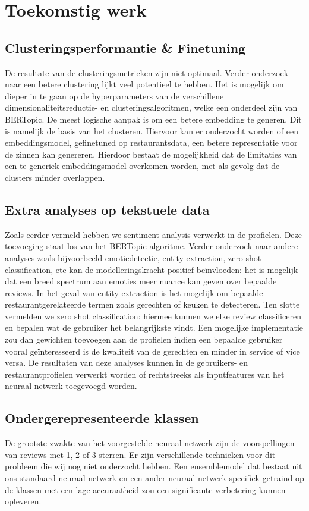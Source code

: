 \section{Toekomstig werk}
\subsection*{Clusteringsperformantie \& Finetuning}
De resultate van de clusteringsmetrieken zijn niet optimaal. Verder onderzoek naar een betere clustering lijkt veel potentieel te hebben. Het is mogelijk om dieper in te gaan op de hyperparameters van de verschillene dimensionaliteitsreductie- en clusteringsalgoritmen, welke een onderdeel zijn van BERTopic. De meest logische aanpak is om een betere embedding te generen. Dit is namelijk de basis van het clusteren. Hiervoor kan er onderzocht worden of een embeddingsmodel, gefinetuned op restaurantsdata, een betere representatie voor de zinnen kan genereren. Hierdoor bestaat de mogelijkheid dat de limitaties van een te generiek embeddingsmodel overkomen worden, met als gevolg dat de clusters minder overlappen.

\subsection*{Extra analyses op tekstuele data}
Zoals eerder vermeld hebben we sentiment analysis verwerkt in de profielen. Deze toevoeging staat los van het BERTopic-algoritme. Verder onderzoek naar andere analyses zoals bijvoorbeeld emotiedetectie, entity extraction, zero shot classification, etc kan de modelleringskracht positief beïnvloeden: het is mogelijk dat een breed spectrum aan emoties meer nuance kan geven over bepaalde reviews. In het geval van entity extraction is het mogelijk om bepaalde restaurantgerelateerde termen zoals gerechten of keuken te detecteren. Ten slotte vermelden we zero shot classification: hiermee kunnen we elke review classificeren en bepalen wat de gebruiker het belangrijkste vindt. Een mogelijke implementatie zou dan gewichten toevoegen aan de profielen indien een bepaalde gebruiker vooral geïnteresseerd is de kwaliteit van de gerechten en minder in service of vice versa.\newline
De resultaten van deze analyses kunnen in de gebruikers- en restaurantprofielen verwerkt worden of rechtstreeks als inputfeatures van het neuraal netwerk toegevoegd worden.

\subsection*{Ondergerepresenteerde klassen}
De grootste zwakte van het voorgestelde neuraal netwerk zijn de voorspellingen van reviews met 1, 2 of 3 sterren. Er zijn verschillende technieken voor dit probleem die wij nog niet onderzocht hebben. Een ensemblemodel dat bestaat uit ons standaard neuraal netwerk en een ander neuraal netwerk specifiek getraind op de klassen met een lage accuraatheid zou een significante verbetering kunnen opleveren.

